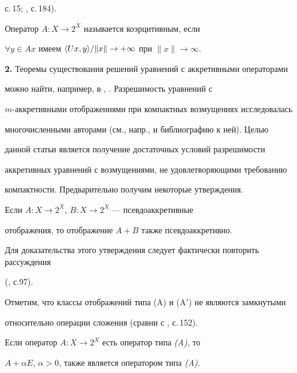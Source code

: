 с.\,15; \cite{Lio}, с.\,184). 


 


\begin{defn} Оператор $A:X\to 2^X$ называется коэрцитивным, если 


$\forall y\in Ax$ имеем $\langle Ux,y\rangle/\|x\|\to +\infty$ при $\|x\|\to\infty$. 


\end{defn} 


 


{\bf 2.} Теоремы существования решений уравнений с аккретивными операторами 


можно найти, например, в \cite{Vai}, \cite{Rya1}. Разрешимость уравнений с 


$m$-аккретивными отображениями при компактных возмущениях исследовалась 


многочисленными авторами (см., напр., \cite{Mor} и библиографию к ней). Целью 


данной статьи является получение достаточных условий разрешимости 


аккретивных уравнений с возмущениями, не удовлетворяющими требованию 


компактности. Предварительно получим некоторые утверждения. 


 


\begin{lem} Если $A:X\to 2^X$, $B:X\to 2^X$ --- псевдоаккретивные 


отображения, то отображение $A+B$ также псевдоаккретивно. 


\end{lem} 


 


Для доказательства этого утверждения следует фактически повторить рассуждения 


(\cite{Pas}, с.97). 


 


Отметим, что классы отображений типа (A) и (A$'$) не являются замкнутыми 


относительно операции сложения (сравни с \cite{Pas}, с.\,152). 


 


\begin{lem} Если оператор $A:X\to 2^X$ есть оператор типа {\em (A),} то 


$A+\alpha E$, $\alpha>0$, также является оператором типа {\em (A).} 


\end{lem} 


